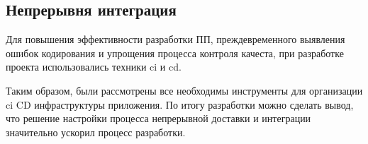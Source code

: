 \subsection{Непрерывня интеграция}
\label{sec:testing:ci}

Для повышения эффективности разработки ПП, преждевременного выявления ошибок кодирования и упрощения процесса контроля качеста, при разработке проекта использовались техники \gls{ci} и \gls{cd}.







Таким образом, были рассмотрены все необходимы инструменты для организации \gls{ci} \gls{CD} инфраструктуры приложения. По итогу разработки можно сделать вывод, что решение настройки процесса непрерывной доставки и интеграции значительно ускорил процесс разработки.